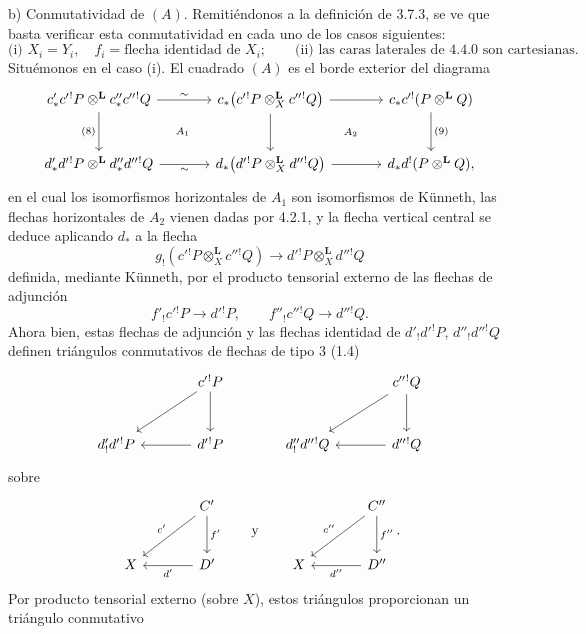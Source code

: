 \begin{prooftext}[Demostración]
b) Conmutatividad de $(A)$. Remitiéndonos a la definición de 3.7.3, se ve que basta verificar esta conmutatividad en cada uno de los casos siguientes:
\[
\text{(i) } X_i=Y_i,\quad f_i=\text{flecha identidad de }X_i;\qquad
\text{(ii) las caras laterales de 4.4.0 son cartesianas.}
\]
Situémonos en el caso (i). El cuadrado $(A)$ es el borde exterior del diagrama
\[
\begin{tikzcd}[column sep=large,row sep=large]
c'_*c'{}^!P\otimes^{\mathbf L}c''_*c''{}^!Q
 \arrow[r,"\sim"] \arrow[d,"(8)"'] &
c_*\bigl(c'{}^!P\otimes_X^{\mathbf L}c''{}^!Q\bigr)
 \arrow[r] \arrow[d] &
c_*c'^!(P\otimes^{\mathbf L} Q)\arrow[d,"(9)"]\\
d'_*d'{}^!P\otimes^{\mathbf L}d''_*d''{}^!Q
 \arrow[r,"\sim"'] &
d_*\bigl(d'{}^!P\otimes_X^{\mathbf L}d''{}^!Q\bigr)
 \arrow[r] &
d_*d^!(P\otimes^{\mathbf L} Q),
\arrow[from=1-1,to=2-2, phantom, "\scriptstyle A_1"]
\arrow[from=1-2,to=2-3, phantom, "\scriptstyle A_2"]
\end{tikzcd}
\]
en el cual los isomorfismos horizontales de $A_1$ son isomorfismos de Künneth, las flechas horizontales de $A_2$ vienen dadas por 4.2.1, y la flecha vertical central se deduce aplicando $d_*$ a la flecha
\[
g_!(c'{}^!P\otimes_X^{\mathbf L}c''{}^!Q)\longrightarrow d'{}^!P\otimes_X^{\mathbf L}d''{}^!Q
\]
definida, mediante Künneth, por el producto tensorial externo de las flechas de adjunción
\[
f'_!c'{}^!P\longrightarrow d'{}^!P,\qquad
f''_!c''{}^!Q\longrightarrow d''{}^!Q.
\]
Ahora bien, estas flechas de adjunción y las flechas identidad de $d'_!d'{}^!P$, $d''_!d''{}^!Q$ definen triángulos conmutativos de flechas de tipo $3$ (1.4)
\[
\begin{tikzcd}[column sep=large,row sep=large]
& c'{}^!P \arrow[d] \arrow[dl] & & c''{}^!Q \arrow[d]\arrow[dl]\\
d'_!d'{}^!P & d'{}^!P\arrow[l] & d''_!d''{}^!Q & d''{}^!Q\arrow[l]
\end{tikzcd}
\]
sobre
\[
\begin{tikzcd}[column sep=large,row sep=large]
& C' \arrow[d,"f'"] \arrow[dl,"c'"']\\
X & D'\arrow[l,"d'"]
\end{tikzcd}
\qquad\text{y}\qquad
\begin{tikzcd}[column sep=large,row sep=large]
& C'' \arrow[d,"f''"] \arrow[dl,"c''"']\\
X & D''\arrow[l,"d''"]
\end{tikzcd}.
\]
Por producto tensorial externo (sobre $X$), estos triángulos proporcionan un triángulo conmutativo
\[
\]
\end{prooftext}
